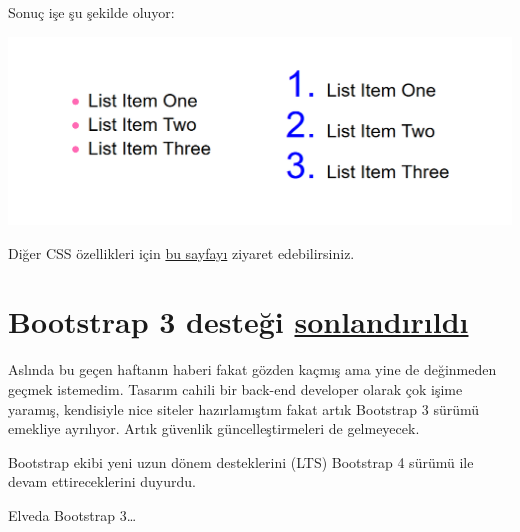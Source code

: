 \documentclass[11pt]{article}
\begin{document}
Sonuç işe şu şekilde oluyor:
\begin{center}
\includegraphics[width=.9\linewidth]{gorseller/css-market.png}
\end{center}

Diğer CSS özellikleri için \href{https://hacks.mozilla.org/2019/07/new-css-features-in-firefox-68/}{bu sayfayı} ziyaret edebilirsiniz.
\section{Bootstrap 3 desteği \href{https://blog.getbootstrap.com/2019/07/24/lts-plan/}{sonlandırıldı}}
\label{sec:org9011227}
Aslında bu geçen haftanın haberi fakat gözden kaçmış ama yine de değinmeden
geçmek istemedim. Tasarım cahili bir back-end developer olarak çok işime
yaramış, kendisiyle nice siteler hazırlamıştım fakat artık Bootstrap 3 sürümü
emekliye ayrılıyor. Artık güvenlik güncelleştirmeleri de gelmeyecek.

Bootstrap ekibi yeni uzun dönem desteklerini (LTS) Bootstrap 4 sürümü ile
devam ettireceklerini duyurdu.

Elveda Bootstrap 3\ldots{}
\end{document}
